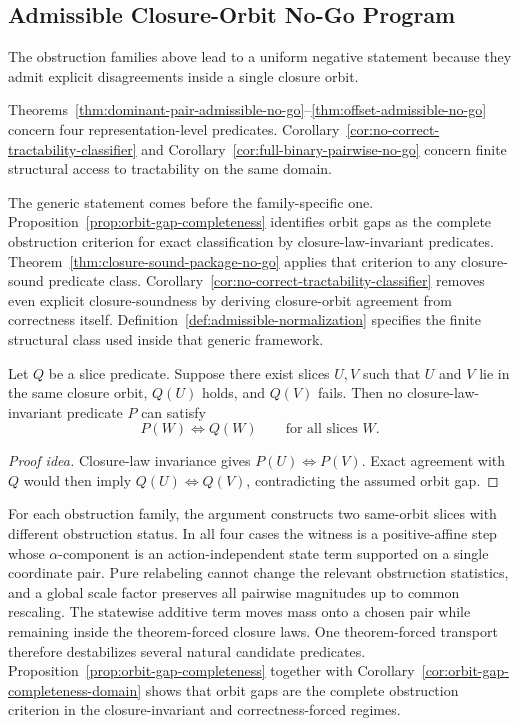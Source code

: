 \subsection*{Admissible Closure-Orbit No-Go Program}

The obstruction families above lead to a uniform negative statement because they admit explicit disagreements inside a single closure orbit.

Theorems~\ref{thm:dominant-pair-admissible-no-go}--\ref{thm:offset-admissible-no-go} concern four representation-level predicates. Corollary~\ref{cor:no-correct-tractability-classifier} and Corollary~\ref{cor:full-binary-pairwise-no-go} concern finite structural access to tractability on the same domain.

The generic statement comes before the family-specific one. Proposition~\ref{prop:orbit-gap-completeness} identifies orbit gaps as the complete obstruction criterion for exact classification by closure-law-invariant predicates. Theorem~\ref{thm:closure-sound-package-no-go} applies that criterion to any closure-sound predicate class. Corollary~\ref{cor:no-correct-tractability-classifier} removes even explicit closure-soundness by deriving closure-orbit agreement from correctness itself. Definition~\ref{def:admissible-normalization} specifies the finite structural class used inside that generic framework.

\begin{proposition}\label{prop:orbit-gap-template}
Let $Q$ be a slice predicate. Suppose there exist slices $U,V$ such that $U$ and $V$ lie in the same closure orbit, $Q(U)$ holds, and $Q(V)$ fails. Then no closure-law-invariant predicate $P$ can satisfy
\[
P(W) \iff Q(W)
\qquad\text{for all slices $W$.}
\]
\end{proposition}

\begin{proof}[Proof idea]
Closure-law invariance gives $P(U) \iff P(V)$. Exact agreement with $Q$ would then imply $Q(U) \iff Q(V)$, contradicting the assumed orbit gap.
\end{proof}

For each obstruction family, the argument constructs two same-orbit slices with different obstruction status. In all four cases the witness is a positive-affine step whose $\alpha$-component is an action-independent state term supported on a single coordinate pair. Pure relabeling cannot change the relevant obstruction statistics, and a global scale factor preserves all pairwise magnitudes up to common rescaling. The statewise additive term moves mass onto a chosen pair while remaining inside the theorem-forced closure laws. One theorem-forced transport therefore destabilizes several natural candidate predicates. Proposition~\ref{prop:orbit-gap-completeness} together with Corollary~\ref{cor:orbit-gap-completeness-domain} shows that orbit gaps are the complete obstruction criterion in the closure-invariant and correctness-forced regimes.

